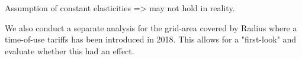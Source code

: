 Assumption of constant elasticities => may not hold in reality. 

We also conduct a separate analysis for the grid-area covered by Radius where a time-of-use tariffs has been introduced in 2018. This allows for a "first-look"  and evaluate whether this had an effect. 

\begin{comment}
Kopi af abstract: 
  Our results are estimated using the Random Effects Instrument Variable-estimator (REIV). Electricity prices are estimated using wind-power production to overcome concerns of endogeneity. Our estimated price elasticities of -0.045 and -0.027 (for wholesale vis-a-vis retail consumers) are small in size. Similarly we find a relatively small effect from the introduction of a time-of-use tariff. Overall results suggest a limited scope for decentralized, price-based tools to alter electricity demand, but these are not conclusive and further research should be devoted to this. 
  
\end{comment}
\begin{comment}
Gammel konklusion: 
We estimate statistically significant own-price elasticities of demand for wholesale consumers and a statistically significant effect of the time-of-use (TOU) tariff in the grid company Radius. However, the economic magnitude of the quite modest is debatable.
\medskip \\
Literature in this field is quite large but there is still substantial room for improvement, especially within the field of estimating hour-by-hour responses at the micro-level to capture heterogeneity in this aspect.
\end{comment}